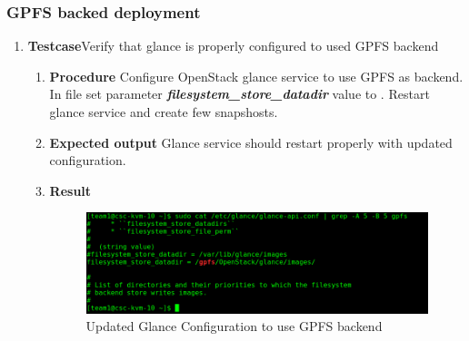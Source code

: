 \subsubsection{GPFS backed deployment}
\begin{enumerate}
\item \textbf{Testcase}\newline Verify that glance is properly configured to used GPFS backend
  \begin{enumerate}[label={}]
  \item \textbf{Procedure}\newline
    Configure OpenStack glance service to use GPFS as backend.
    In file  set parameter
    \textbf{\textit{filesystem\_store\_datadir}} value to .
    Restart glance service and create few snapshosts.
  \item \textbf{Expected output}\newline
    Glance service should restart properly with updated configuration.
  \item \textbf{Result}\newline
    \begin{figure}
      \centering
      \includegraphics[scale=0.4]{screenshots/gpfs-conf.png}
      \caption{Updated Glance Configuration to use GPFS backend}
      \label{gpfs-conf}
    \end{figure}
  \end{enumerate}


\end{enumerate}
